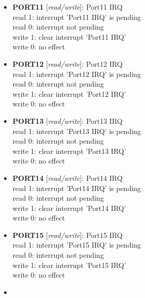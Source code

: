 \begin{itemize}
\begin{small}
\end{small}
\item \begin{small}
{\bf 
PORT11
} [\emph{read/write}]: Port11 IRQ
\\
read 1: interrupt 'Port11 IRQ' is pending\\read 0: interrupt not pending\\write 1: clear interrupt 'Port11 IRQ'\\write 0: no effect
\end{small}
\item \begin{small}
{\bf 
PORT12
} [\emph{read/write}]: Port12 IRQ
\\
read 1: interrupt 'Port12 IRQ' is pending\\read 0: interrupt not pending\\write 1: clear interrupt 'Port12 IRQ'\\write 0: no effect
\end{small}
\item \begin{small}
{\bf 
PORT13
} [\emph{read/write}]: Port13 IRQ
\\
read 1: interrupt 'Port13 IRQ' is pending\\read 0: interrupt not pending\\write 1: clear interrupt 'Port13 IRQ'\\write 0: no effect
\end{small}
\item \begin{small}
{\bf 
PORT14
} [\emph{read/write}]: Port14 IRQ
\\
read 1: interrupt 'Port14 IRQ' is pending\\read 0: interrupt not pending\\write 1: clear interrupt 'Port14 IRQ'\\write 0: no effect
\end{small}
\item \begin{small}
{\bf 
PORT15
} [\emph{read/write}]: Port15 IRQ
\\
read 1: interrupt 'Port15 IRQ' is pending\\read 0: interrupt not pending\\write 1: clear interrupt 'Port15 IRQ'\\write 0: no effect
\end{small}
\item \begin{small}

\end{small}
\end{itemize}
